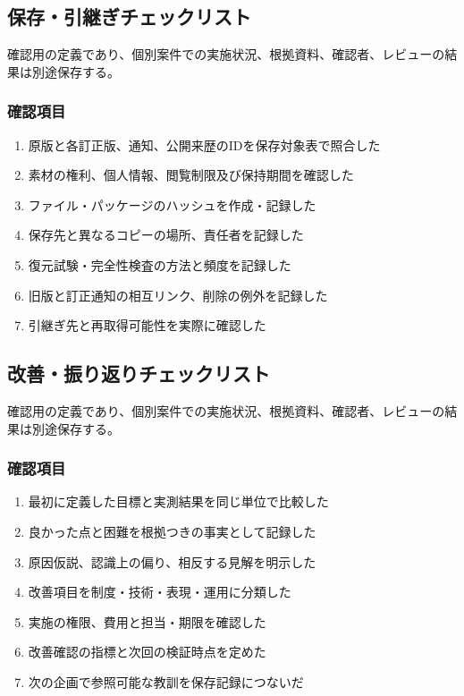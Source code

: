 \documentclass[a4paper,11pt]{article}
\begin{document}
\subsection{保存・引継ぎチェックリスト}
\par 確認用の定義であり、個別案件での実施状況、根拠資料、確認者、レビューの結果は別途保存する。\par\medskip
\subsubsection*{確認項目}
\begin{enumerate}[leftmargin=2em,itemsep=0.3em]
\item 原版と各訂正版、通知、公開来歴のIDを保存対象表で照合した\par
\item 素材の権利、個人情報、閲覧制限及び保持期間を確認した\par
\item ファイル・パッケージのハッシュを作成・記録した\par
\item 保存先と異なるコピーの場所、責任者を記録した\par
\item 復元試験・完全性検査の方法と頻度を記録した\par
\item 旧版と訂正通知の相互リンク、削除の例外を記録した\par
\item 引継ぎ先と再取得可能性を実際に確認した\par
\end{enumerate}
\subsection{改善・振り返りチェックリスト}
\par 確認用の定義であり、個別案件での実施状況、根拠資料、確認者、レビューの結果は別途保存する。\par\medskip
\subsubsection*{確認項目}
\begin{enumerate}[leftmargin=2em,itemsep=0.3em]
\item 最初に定義した目標と実測結果を同じ単位で比較した\par
\item 良かった点と困難を根拠つきの事実として記録した\par
\item 原因仮説、認識上の偏り、相反する見解を明示した\par
\item 改善項目を制度・技術・表現・運用に分類した\par
\item 実施の権限、費用と担当・期限を確認した\par
\item 改善確認の指標と次回の検証時点を定めた\par
\item 次の企画で参照可能な教訓を保存記録につないだ\par
\end{enumerate}
\end{document}

